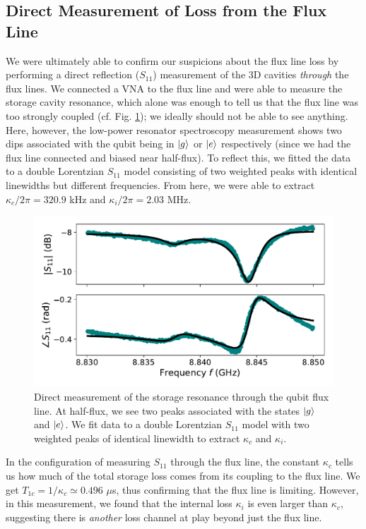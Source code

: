 \subsection{Direct Measurement of Loss from the Flux Line}

We were ultimately able to confirm our suspicions about the flux line loss by performing a direct reflection ($S_{11}$) measurement of the 3D cavities \textit{through} the flux lines. We connected a VNA to the flux line and were able to measure the storage cavity resonance, which alone was enough to tell us that the flux line was too strongly coupled (cf. Fig. \ref{fig:4_storage_loss_thru_flux_line}); we ideally should not be able to see anything. Here, however, the low-power resonator spectroscopy measurement shows two dips associated with the qubit being in $\lvert g\rangle$ or $\lvert e\rangle$ respectively (since we had the flux line connected and biased near half-flux). To reflect this, we fitted the data to a double Lorentzian $S_{11}$ model consisting of two weighted peaks with identical linewidths but different frequencies. From here, we were able to extract $\kappa_c/2\pi = 320.9$ kHz and $\kappa_i/2\pi = 2.03$ MHz. 

\begin{figure}[h]
    \centering
    \includegraphics[width=0.7\linewidth]{Figures/4/storage_loss_thru_flux_line.pdf}
    \caption{Direct measurement of the storage resonance through the qubit flux line. At half-flux, we see two peaks associated with the states $\lvert g\rangle$ and $\lvert e\rangle$. We fit data to a double Lorentzian $S_{11}$ model with two weighted peaks of identical linewidth to extract $\kappa_c$ and $\kappa_i$.}
    \label{fig:4_storage_loss_thru_flux_line}
\end{figure}

In the configuration of measuring $S_{11}$ through the flux line, the constant $\kappa_c$ tells us how much of the total storage loss comes from its coupling to the flux line. We get $T_{1c} = 1/\kappa_c \simeq 0.496$ $\mu$s, thus confirming that the flux line is limiting. However, in this measurement, we found that the internal loss $\kappa_i$ is even larger than $\kappa_c$, suggesting there is \textit{another} loss channel at play beyond just the flux line. 

